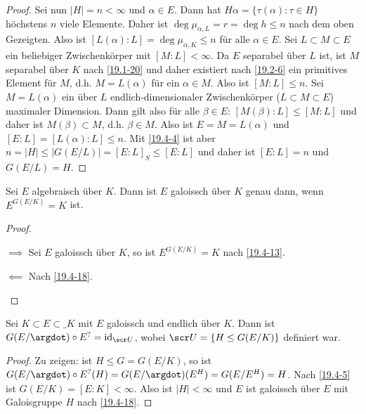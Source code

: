 \begin{st}[Artin]
\begin{proof}
		Sei nun $|H| = n < \infty$ und $\alpha \in E$.
		Dann hat $H\alpha = \{ \tau(\alpha) : \tau \in H \}$ höchstens $n$ viele Elemente.
		Daher ist $\deg \mu_{\alpha, L} = r = \deg h \le n$ nach dem oben Gezeigten. 
		Also ist $[L(\alpha) : L] = \deg \mu_{\alpha, K} \le n$ für alle $\alpha \in E$.
		Sei $L \subset M \subset E$ ein beliebiger Zwischenkörper mit $[M: L] < \infty$.
		Da $E$ separabel über $L$ ist, ist $M$ separabel über $K$ nach \ref{19.1-20} und daher existiert nach \ref{19.2-6} ein primitives Element für $M$, d.h. $M = L(\alpha)$ für ein $\alpha \in M$.
		Also ist $[M : L] \le n$.
		Sei $M = L(\alpha)$ ein über $L$ endlich-dimensionaler Zwischenkörper ($L \subset M \subset E$) maximaler Dimension.
		Dann gilt also für alle $\beta \in E$: $[M(\beta) : L] \le [M : L]$ und daher ist $M(\beta) \subset M$, d.h. $\beta \in M$.
		Also ist $E = M = L(\alpha)$ und $[E : L] = [L(\alpha) : L] \le n$.
		Mit \ref{19.4-4} ist aber $n = |H| \le |G(E/L)| = [E:L]_S \le [E : L]$ und daher ist $[E : L] = n$ und $G(E / L) = H$.
	\end{proof}
\end{st}

\begin{kor} \label{19.4-19}
	Sei $E$ algebraisch über $K$.
	Dann ist $E$ galoissch über $K$ genau dann, wenn $E^{G(E / K)} = K$ ist.
	\begin{proof}
		\begin{segnb}{$\implies$}
			Sei $E$ galoissch über $K$, so ist $E^{G(E/K)} = K$ nach \ref{19.4-13}.
		\end{segnb}
		\begin{segnb}{$\impliedby$}
			Nach \ref{19.4-18}.
		\end{segnb}
	\end{proof}
\end{kor}

\begin{kor} \label{19.4-20}
	Sei $K \subset E \subset \_K$ mit $E$ galoissch und endlich über $K$.
	Dann ist $G(E / \argdot) \circ E^? = \id_{\scr U}$, wobei $\scr U = \{ H \le G(E / K) \}$ definiert war.
	\begin{proof}
		Zu zeigen: ist $H \le G = G(E / K)$, so ist $G(E / \argdot) \circ E^? (H) = G(E / \argdot) (E^H) = G(E / E^H) = H$.
		Nach \ref{19.4-5} ist $G(E / K) = [E : K] < \infty$.
		Also ist $|H| < \infty$ und $E$ ist galoissch über $E$ mit Galoisgruppe $H$ nach \ref{19.4-18}.
	\end{proof}
\end{kor}

